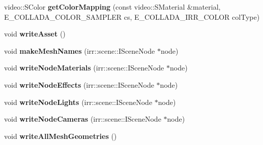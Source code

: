 \begin{DoxyCompactItemize}
\item 
\hypertarget{classirr_1_1scene_1_1_c_collada_mesh_writer_a36b08c92e3333f6a3cb6d294eee4c193}{video\-::\-S\-Color {\bfseries get\-Color\-Mapping} (const video\-::\-S\-Material \&material, E\-\_\-\-C\-O\-L\-L\-A\-D\-A\-\_\-\-C\-O\-L\-O\-R\-\_\-\-S\-A\-M\-P\-L\-E\-R cs, E\-\_\-\-C\-O\-L\-L\-A\-D\-A\-\_\-\-I\-R\-R\-\_\-\-C\-O\-L\-O\-R col\-Type)}\label{classirr_1_1scene_1_1_c_collada_mesh_writer_a36b08c92e3333f6a3cb6d294eee4c193}

\item 
\hypertarget{classirr_1_1scene_1_1_c_collada_mesh_writer_a905fd64ff1f411b2132fa76fa7729e30}{void {\bfseries write\-Asset} ()}\label{classirr_1_1scene_1_1_c_collada_mesh_writer_a905fd64ff1f411b2132fa76fa7729e30}

\item 
\hypertarget{classirr_1_1scene_1_1_c_collada_mesh_writer_a3719e90126ef4f593d7bb4c56ca775c3}{void {\bfseries make\-Mesh\-Names} (irr\-::scene\-::\-I\-Scene\-Node $\ast$node)}\label{classirr_1_1scene_1_1_c_collada_mesh_writer_a3719e90126ef4f593d7bb4c56ca775c3}

\item 
\hypertarget{classirr_1_1scene_1_1_c_collada_mesh_writer_aa24293847780f89db509d28813a12b4d}{void {\bfseries write\-Node\-Materials} (irr\-::scene\-::\-I\-Scene\-Node $\ast$node)}\label{classirr_1_1scene_1_1_c_collada_mesh_writer_aa24293847780f89db509d28813a12b4d}

\item 
\hypertarget{classirr_1_1scene_1_1_c_collada_mesh_writer_ad66ca1230343b6cf7f62d08931eadb26}{void {\bfseries write\-Node\-Effects} (irr\-::scene\-::\-I\-Scene\-Node $\ast$node)}\label{classirr_1_1scene_1_1_c_collada_mesh_writer_ad66ca1230343b6cf7f62d08931eadb26}

\item 
\hypertarget{classirr_1_1scene_1_1_c_collada_mesh_writer_ad71af3b34d3e36925fc5bf81d94e2a01}{void {\bfseries write\-Node\-Lights} (irr\-::scene\-::\-I\-Scene\-Node $\ast$node)}\label{classirr_1_1scene_1_1_c_collada_mesh_writer_ad71af3b34d3e36925fc5bf81d94e2a01}

\item 
\hypertarget{classirr_1_1scene_1_1_c_collada_mesh_writer_a4c7aead4519431a3a2f39cdbeb0e2a4c}{void {\bfseries write\-Node\-Cameras} (irr\-::scene\-::\-I\-Scene\-Node $\ast$node)}\label{classirr_1_1scene_1_1_c_collada_mesh_writer_a4c7aead4519431a3a2f39cdbeb0e2a4c}

\item 
\hypertarget{classirr_1_1scene_1_1_c_collada_mesh_writer_a07b15cbd870dddb451790dfdc749b452}{void {\bfseries write\-All\-Mesh\-Geometries} ()}\label{classirr_1_1scene_1_1_c_collada_mesh_writer_a07b15cbd870dddb451790dfdc749b452}


\end{DoxyCompactItemize}
